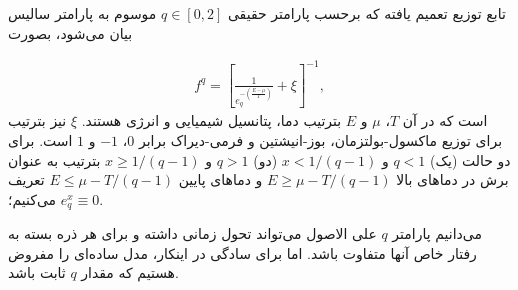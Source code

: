 \documentclass[a4paper]{book}
\begin{document}
تابع توزیع تعمیم یافته که برحسب پارامتر حقیقی {\footnotesize$q\in[0,2]$} موسوم به پارامتر سالیس بیان می‌شود، بصورت \cite{tsallis_introduction_2023}
\par
\vspace{-0.5cm}
{\footnotesize\begin{align}
	f^{q} = \left[ \frac{1}{e_q^{-(\frac{E-\mu}{T})}}+\xi\right]^{-1},
	\label{eq:dist-nonextensive}
\end{align}}
است که در آن {\footnotesize$T$}، {\footnotesize$\mu$} و {\footnotesize$E$} بترتیب دما، پتانسیل شیمیایی و انرژی هستند. {\footnotesize$\xi$} نیز بترتیب برای توزیع ماکسول-بولتزمان، بوز-انیشتین و فرمی-دیراک برابر {\footnotesize$0$}، {\footnotesize$-1$} و {\footnotesize$1$} است. برای دو حالت (یک) {\footnotesize$q<1$} و {\footnotesize$x<1/(q-1)$} (دو) {\footnotesize$q>1$} و {\footnotesize$x \ge 1/(q-1)$} بترتیب به عنوان برش در دماهای بالا {\footnotesize$E\ge \mu - T/(q-1)$} و دماهای پایین {\footnotesize$E \le \mu - T/(q-1)$} تعریف می‌کنیم؛ {\footnotesize$e_q^x \equiv 0$}.

می‌دانیم پارامتر {\footnotesize$q$} علی الاصول می‌تواند تحول زمانی داشته و برای هر ذره بسته به رفتار خاص آنها متفاوت باشد. اما برای سادگی در اینکار، مدل ساده‌ای را مفروض هستیم که مقدار {\footnotesize$q$} ثابت باشد.
\end{document}
